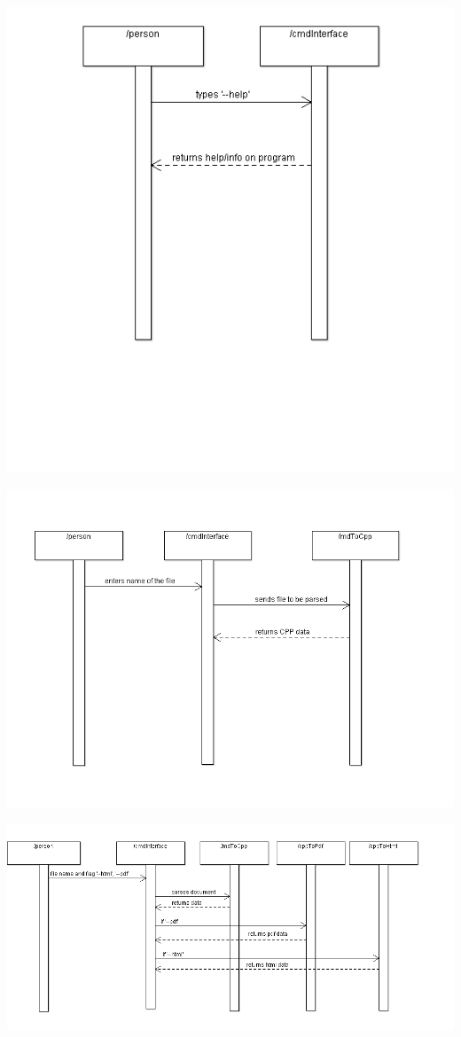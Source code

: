 \hspace{-2cm}\includegraphics[width=450pt]{images/GettingHelp.png}

\hspace{-2cm}\includegraphics[width=500pt]{images/SpecifyingFile.png}

\hspace{-3cm}\includegraphics[width=550pt]{images/SpecifyingOutputFile.png}

